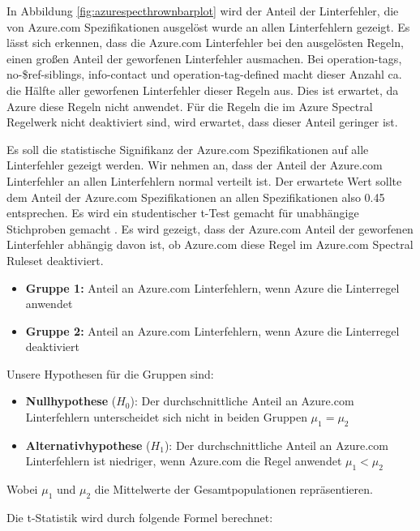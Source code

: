 In Abbildung \ref{fig:azurespecthrownbarplot} wird der Anteil der Linterfehler, die von Azure.com Spezifikationen ausgelöst wurde an allen Linterfehlern gezeigt. Es lässt sich erkennen, dass die Azure.com Linterfehler bei den ausgelösten Regeln, einen großen Anteil der geworfenen Linterfehler ausmachen. Bei operation-tags, no-\$ref-siblings, info-contact und operation-tag-defined macht dieser Anzahl ca. die Hälfte aller geworfenen Linterfehler dieser Regeln aus. Dies ist erwartet, da Azure diese Regeln nicht anwendet. Für die Regeln die im Azure Spectral Regelwerk nicht deaktiviert sind, wird erwartet, dass dieser Anteil geringer ist. 

Es soll die statistische Signifikanz der Azure.com Spezifikationen auf alle Linterfehler gezeigt werden. Wir nehmen an, dass der Anteil der Azure.com Linterfehler an allen Linterfehlern normal verteilt ist. Der erwartete Wert sollte dem Anteil der Azure.com Spezifikationen an allen Spezifikationen also 0.45 entsprechen. Es wird ein studentischer t-Test gemacht für unabhängige Stichproben gemacht \parencite{mittag_statistik_2023}. Es wird gezeigt, dass der Azure.com Anteil der geworfenen Linterfehler abhängig davon ist, ob Azure.com diese Regel im Azure.com Spectral Ruleset deaktiviert.

\begin{itemize}
  \item \textbf{Gruppe 1:} Anteil an Azure.com Linterfehlern, wenn Azure die Linterregel anwendet
  \item \textbf{Gruppe 2:} Anteil an Azure.com Linterfehlern, wenn Azure die Linterregel deaktiviert
\end{itemize}

Unsere Hypothesen für die Gruppen sind:

\begin{itemize}
  \item \textbf{Nullhypothese} ($H_0$): Der durchschnittliche Anteil an Azure.com Linterfehlern unterscheidet sich nicht in beiden Gruppen  $\mu_1 = \mu_2$
  \item \textbf{Alternativhypothese} ($H_1$): Der durchschnittliche Anteil an Azure.com Linterfehlern ist niedriger, wenn Azure.com die Regel anwendet $\mu_1 < \mu_2$
\end{itemize}

Wobei $\mu_1$ und $\mu_2$ die Mittelwerte der Gesamtpopulationen repräsentieren.

Die t-Statistik wird durch folgende Formel berechnet:

